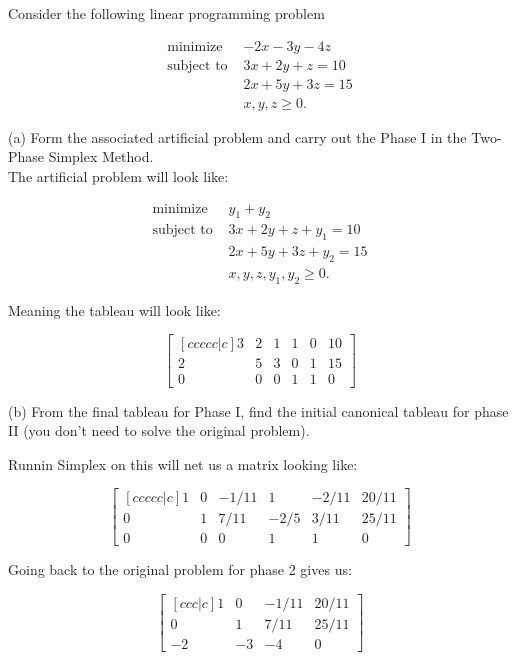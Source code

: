 \documentclass[12pt]{extarticle}
\theoremstyle{definition}
\begin{document}
\begin{problem} Consider the following linear programming problem

  	\begin{align*}
	\text{minimize } &-2x-3y-4z\\
	\text{subject to } & 3x+2y+z=10\\
	&2x+5y+3z=15\\
	&x,y,z\geq 0.
	\end{align*}

	\begin{description}
		\item{(a)} Form the associated artificial problem and carry out the Phase I in the Two-Phase Simplex Method.\\

		The artificial problem will look like:

		  	\begin{align*}
			\text{minimize } &y_1+y_2\\
			\text{subject to } & 3x+2y+z+y_1=10\\
			&2x+5y+3z+y_2=15\\
			&x,y,z,y_1,y_2\geq 0.
			\end{align*}

		Meaning the tableau will look like:

		$$\begin{bmatrix}[ccccc|c] 3&2&1&1&0&10\\ 2&5&3&0&1&15\\ 0&0&0&1&1&0 \end{bmatrix}$$

		\item{(b)} From the final tableau for Phase I, find the initial canonical tableau for phase II (you don't need to solve the original problem).

		Runnin Simplex on this will net us a matrix looking like:
		
		$$\begin{bmatrix}[ccccc|c] 1&0&-1/11&1&-2/11&20/11\\ 0&1&7/11&-2/5&3/11&25/11\\ 0&0&0&1&1&0 \end{bmatrix}$$

		Going back to the original problem for phase 2 gives us:

		$$\begin{bmatrix}[ccc|c] 1&0&-1/11&20/11\\ 0&1&7/11&25/11\\ -2&-3&-4&0 \end{bmatrix}$$

	\end{description}

\end{problem}
\end{document}
